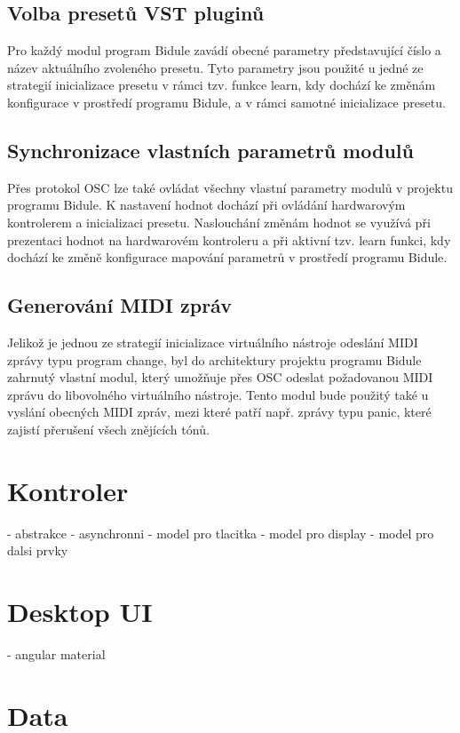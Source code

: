 \documentclass[thesis=M,czech]{FITthesis}[2019/03/06]
\begin{document}
		\subsection{Volba presetů VST pluginů}
		Pro každý modul program Bidule zavádí obecné parametry představující číslo a název aktuálního zvoleného presetu.
		Tyto parametry jsou použité u jedné ze strategií inicializace presetu v rámci tzv. funkce learn, kdy dochází
		ke změnám konfigurace v prostředí programu Bidule, a v rámci samotné inicializace presetu.

		\subsection{Synchronizace vlastních parametrů modulů}
		Přes protokol OSC lze také ovládat všechny vlastní parametry modulů v projektu programu Bidule.
		K nastavení hodnot dochází při ovládání hardwarovým kontrolerem a inicializaci presetu.
		Naslouchání změnám hodnot se využívá při prezentaci hodnot na hardwarovém kontroleru
		a při aktivní tzv. learn funkci, kdy dochází ke změně konfigurace mapování parametrů v prostředí programu Bidule.

		\subsection{Generování MIDI zpráv}
		Jelikož je jednou ze strategií inicializace virtuálního nástroje odeslání MIDI zprávy typu program change,
		byl do architektury projektu programu Bidule zahrnutý vlastní modul, který umožňuje přes OSC odeslat požadovanou MIDI zprávu
		do libovolného virtuálního nástroje. Tento modul bude použitý také u vyslání obecných MIDI zpráv,
		mezi které patří např. zprávy typu panic, které zajistí přerušení všech znějících tónů.
	
	\section{Kontroler}
	
		- abstrakce
		- asynchronni
		- model pro tlacitka
		- model pro display
		- model pro dalsi prvky
	
	\section{Desktop UI}
		- angular material
		
	\section{Data}
\end{document}
